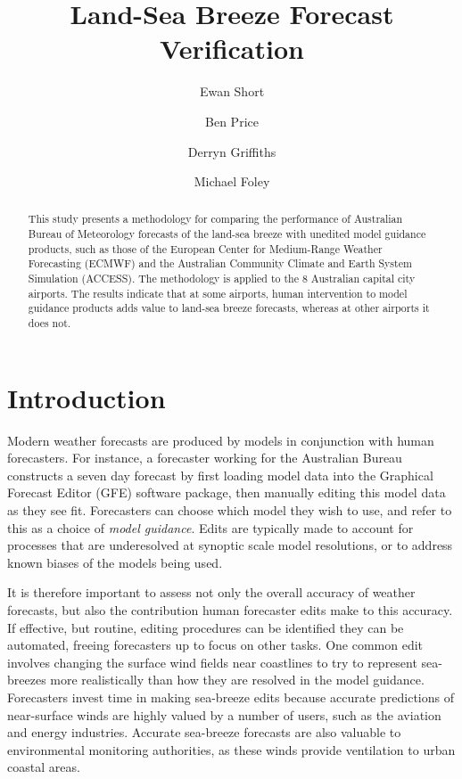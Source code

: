 \documentclass[alpha-refs]{wiley-article}
\title{Land-Sea Breeze Forecast Verification}
\author[1]{Ewan Short}
\author[2]{Ben Price}
\author[3]{Derryn Griffiths}
\author[3]{Michael Foley}
\affil[1]{ARC Centre of Excellence for Climate Extremes, School of Earth Sciences, University of Melbourne, Parkville, VIC, 3010, Australia}
\affil[2]{Bureau of Meteorology, Casuarina, NT, 0810, Australia}
\affil[3]{Bureau of Meteorology, Melbourne, VIC, 3208, Australia}
\begin{document}
\maketitle

\begin{abstract}
This study presents a methodology for comparing the performance of Australian Bureau of Meteorology forecasts of the land-sea breeze with unedited model guidance products, such as those of the European Center for Medium-Range Weather Forecasting (ECMWF) and the Australian Community Climate and Earth System Simulation (ACCESS). The methodology is applied to the 8 Australian capital city airports. The results indicate that at some airports, human intervention to model guidance products adds value to land-sea breeze forecasts, whereas at other airports it does not. 

\end{abstract}

\section{Introduction}\label{introduction}
Modern weather forecasts are produced by models in conjunction with human forecasters. For instance, a forecaster working for the Australian Bureau constructs a seven day forecast by first loading model data into the Graphical Forecast Editor (GFE) software package, then manually editing this model data as they see fit. Forecasters can choose which model they wish to use, and refer to this as a choice of \textit{model guidance}. Edits are typically made to account for processes that are underesolved at synoptic scale model resolutions, or to address known biases of the models being used. 

It is therefore important to assess not only the overall accuracy of weather forecasts, but also the contribution human forecaster edits make to this accuracy. If effective, but routine, editing procedures can be identified they can be automated, freeing forecasters up to focus on other tasks. One common edit involves changing the surface wind fields near coastlines to try to represent sea-breezes more realistically than how they are resolved in the model guidance. Forecasters invest time in making sea-breeze edits because accurate predictions of near-surface winds are highly valued by a number of users, such as the aviation and energy \citep{smith09} industries. Accurate sea-breeze forecasts are also valuable to environmental monitoring authorities, as these winds provide ventilation to urban coastal areas. 
\end{document}
